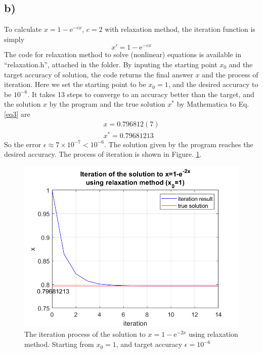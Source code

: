 \documentclass[12pt, graphicx]{article}
\begin{document}
\subsection*{b)}
To calculate $x=1-\mathrm{e}^{-cx}$, $c=2$ with relaxation method, the iteration function is simply 
\begin{equation}
x'=1-\mathrm{e}^{-cx}
\label{eq3}
\end{equation}
The code for relaxation method to solve (nonlinear) equations is available in \textquotedblleft relaxation.h\textquotedblright, attached in the folder. By inputing the starting point $x_0$ and the target accuracy of solution, the code returns the final answer $x$ and the process of iteration. Here we set the starting point to be $x_0=1$, and the desired accuracy to be $10^{-6}$. It takes 13 steps to converge to an accuracy better than the target, and the solution $x$ by the program and the true solution $x^*$ by Mathematica to Eq. \ref{eq3} are
\begin{equation}
\begin{gathered}
x=0.796812(7)\\
x^*=0.79681213
\end{gathered}
\end{equation}
So the error $\epsilon\approx7\times10^{-7}<10^{-6}$. The solution given by the program reaches the desired accuracy. The process of iteration is shown in Figure. \ref{fig:rel}. 

\begin{figure}[ht]
\centering
\includegraphics[width = 120mm]{relaxation.png}
\caption{The iteration process of the solution to $x=1-\mathrm{e}^{-2x}$ using relaxation method. Starting from $x_0=1$, and target accuracy $\epsilon=10^{-6}$}
\label{fig:rel}
\end{figure}
\end{document}
